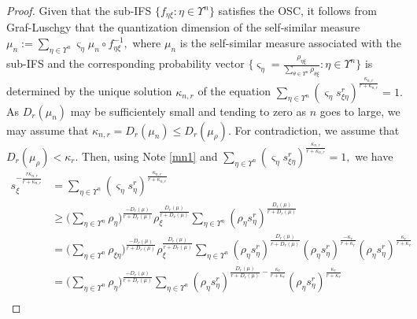 \documentclass{amsproc}
\theoremstyle{definition}
\theoremstyle{remark}
\numberwithin{equation}{section}
\begin{document}
\begin{proof}
Given that the sub-IFS $\{f_{ \eta \xi}: \eta \in \Upsilon^n\}$ satisfies the OSC, it follows from Graf-Luschgy \cite{GL1} that the quantization dimension of the self-similar measure 
$\mu_n:= \sum_{\eta \in \Upsilon^n} \varsigma_{\eta} \mu_n \circ f_{ \eta \xi}^{-1},$
where $\mu_n$ is the self-similar measure associated with the sub-IFS and the corresponding probability vector 
$\{\varsigma_{\eta}= \frac{\rho_{ \eta \xi}}{ \sum_{\theta \in \Upsilon^n} \rho_{\theta \xi}} : \eta \in \Upsilon^n\}$ 
is determined by the unique solution $\kappa_{n,r}$ of the equation
$\sum_{\eta \in \Upsilon^n} (\varsigma_{\eta} s_{\xi \eta}^r)^{\frac{\kappa_{n,r}}{r + \kappa_{n,r}}}= 1.$
As $D_r(\mu_n)$ may be sufficientely small and tending to zero as $n$ goes to large, we may assume that $\kappa_{n,r}=D_r(\mu_n) \le D_r(\mu_{\rho}).$ For contradiction, we assume that $D_r(\mu_{\rho}) < \kappa_{r}$. Then, using Note \ref{mn1} and $\sum_{\eta \in \Upsilon^n} (\varsigma_{\eta} s_{\xi \eta}^r)^{\frac{\kappa_{n,r}}{r + \kappa_{n,r}}}=1,$ we have 
\begin{align*}
s_{\xi}^{-\frac{r \kappa_{n,r}}{r + \kappa_{n,r}}} 
&= \sum_{\eta \in \Upsilon^n} (\varsigma_{\eta}  s_{ \eta}^r)^{\frac{\kappa_{n,r}}{r + \kappa_{n,r}}}  \\
&\ge \bigg(\sum_{\eta \in \Upsilon^n} \rho_{ \eta}\bigg)^{\frac{-D_r(\mu)}{r+ D_r(\mu)}}\rho_{\xi}^{\frac{D_r(\mu)}{r+ D_r(\mu)}} \sum_{\eta \in \Upsilon^n} (\rho_{ \eta}  s_{ \eta}^r)^{\frac{D_r(\mu)}{r + D_r(\mu)}} \\
& = \bigg(\sum_{\eta \in \Upsilon^n} \rho_{\xi \eta}\bigg)^{\frac{-D_r(\mu)}{r+ D_r(\mu)}}\rho_{\xi}^{\frac{D_r(\mu)}{r+ D_r(\mu)}} \sum_{\eta \in \Upsilon^n} (\rho_{ \eta}  s_{ \eta}^r)^{\frac{D_r(\mu)}{r + D_r(\mu)}}(\rho_{ \eta}   s_{ \eta}^r)^{\frac{-\kappa_{r}}{r + \kappa_{r}}} (\rho_{ \eta}  s_{ \eta}^r)^{\frac{\kappa_{r}}{r + \kappa_{r}}} \\
&= \bigg(\sum_{\eta \in \Upsilon^n} \rho_{\eta}\bigg)^{\frac{-D_r(\mu)}{r+ D_r(\mu)}}\sum_{\eta \in \Upsilon^n} (\rho_{\eta}  s_{ \eta}^r)^{\frac{D_r(\mu) }{r + D_r(\mu)}- \frac{\kappa_{r}}{r + \kappa_{r}}} (\rho_{\eta}  s_{ \eta}^r)^{\frac{\kappa_{r}}{r + \kappa_{r}}}\\

\end{align*}
\end{proof}
\end{document}
